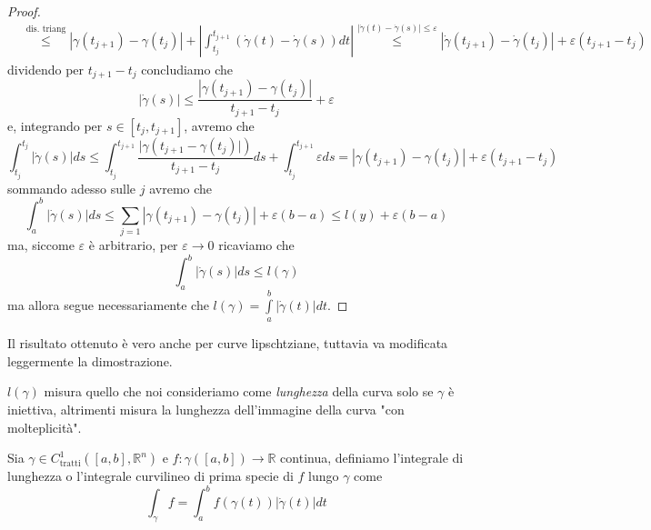 \begin{proof}
\begin{align*}
&\stackrel{\text{dis. triang}}{\leq} |\gamma(t_{j+1}) - \gamma(t_j)| + |\int_{t_j}^{t_{j+1}} (\dot{\gamma}(t) - \dot{\gamma}(s))dt| \stackrel{|\dot{\gamma}(t)-\dot{\gamma}(s)| \leq \varepsilon}{\leq} |\dot{\gamma}(t_{j+1}) - \dot{\gamma}(t_j)| + \varepsilon(t_{j+1} - t_{j})
\end{align*}
dividendo per $t_{j+1} - t_j$ concludiamo che
$$
|\dot{\gamma}(s)| \leq \frac{|\gamma(t_{j+1})-\gamma(t_j)|}{t_{j+1} - t_j} + \varepsilon
$$
e, integrando per $s \in [t_j, t_{j+1}]$, avremo che
$$
\int_{t_{j}}^{t_j} |\dot{\gamma}(s)|ds \leq \int_{t_j}^{t_{j+1}} \frac{|\gamma(t_{j+1} - \gamma(t_j)|)}{t_{j+1}-t_j} ds + \int_{t_j}^{t_{j+1}} \varepsilon ds = |\gamma(t_{j+1})-\gamma(t_j)| + \varepsilon(t_{j+1} - t_j)
$$
sommando adesso sulle $j$ avremo che
$$
\int_a^b |\dot{\gamma}(s)|ds \leq \sum_{j=1} |\gamma(t_{j+1})-\gamma(t_j)| + \varepsilon(b-a) \leq l(y) + \varepsilon(b-a) 
$$
ma, siccome $\varepsilon$ è arbitrario, per $\varepsilon \to 0$ ricaviamo che
$$
\int_a^b |\dot{\gamma}(s)|ds \leq l(\gamma)
$$
ma allora segue necessariamente che $l(\gamma) = \int\limits_a^b |\dot{\gamma}(t)|dt$.
\end{proof}
\begin{remark}
Il risultato ottenuto è vero anche per curve lipschtziane, tuttavia va modificata leggermente la dimostrazione.
\end{remark}
\begin{remark}
$l(\gamma)$ misura quello che noi consideriamo come \emph{lunghezza} della curva solo se $\gamma$ è iniettiva, altrimenti misura la lunghezza dell'immagine della curva "con molteplicità".
\end{remark}
\begin{definition}
	Sia $\gamma \in C^1_{\text{tratti}}([a,b], \mathbb{R}^n)$ e $f: \gamma([a,b]) \to \mathbb{R}$ continua, definiamo l'integrale di lunghezza o l'integrale curvilineo di prima specie di $f$ lungo $\gamma$ come
	$$
		\int_{\gamma} f = \int_a^b f(\gamma(t))|\dot{\gamma}(t)|dt
	$$
\end{definition}


